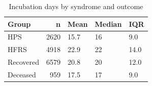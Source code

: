 \begin{table}[htbp]
\caption{Incubation days by syndrome and outcome}
\label{tab:incubation_groups}
\begin{tabular}{lrlll}
\toprule
Group & n & Mean & Median & IQR \\
\midrule
HPS & 2620 & 15.7 & 16 & 9.0 \\
HFRS & 4918 & 22.9 & 22 & 14.0 \\
Recovered & 6579 & 20.8 & 20 & 12.0 \\
Deceased & 959 & 17.5 & 17 & 9.0 \\
\bottomrule
\end{tabular}
\end{table}
